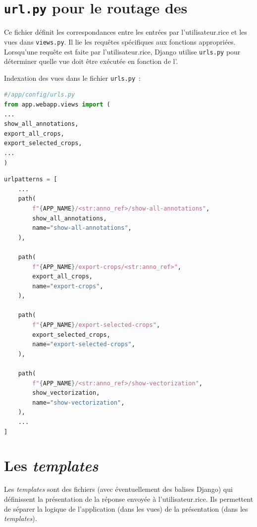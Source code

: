 \section{\texttt{url.py} pour le routage des \URLs}

Ce fichier définit les correspondances entre les \URLs entrées par l'utilisateur.rice et les vues dans \texttt{views.py}. Il lie les requêtes \URL spécifiques aux fonctions appropriées. Lorsqu'une requête est faite par l'utilisateur.rice, Django utilise \texttt{urls.py} pour déterminer quelle vue doit être exécutée en fonction de l'\URL.

Indexation des vues dans le fichier \texttt{urls.py}~:

\begin{lstlisting}[language=python, frame=single, breaklines=true, caption={Contenu du ficher \texttt{urls.py}~: import des \texttt{views}.}]
#/app/config/urls.py
from app.webapp.views import (
...
show_all_annotations,
export_all_crops,
export_selected_crops,
...
)
\end{lstlisting}

\begin{lstlisting}[language=python, frame=single, breaklines=true, caption={Contenu du ficher \texttt{urls.py}~: routage des fonctions et des \URLs.}]
urlpatterns = [
    ...
    path(
        f"{APP_NAME}/<str:anno_ref>/show-all-annotations",
        show_all_annotations,
        name="show-all-annotations",
    ),

    path(
        f"{APP_NAME}/export-crops/<str:anno_ref>",
        export_all_crops,
        name="export-crops",
    ),

    path(
        f"{APP_NAME}/export-selected-crops",
        export_selected_crops,
        name="export-selected-crops",
    ),

    path(
        f"{APP_NAME}/<str:anno_ref>/show-vectorization",
        show_vectorization,
        name="show-vectorization",
    ),
    ...
]
\end{lstlisting}

\section{Les \emph{templates}}

Les \textit{templates} sont des fichiers \html (avec éventuellement des balises Django) qui définissent la présentation de la réponse envoyée à l'utilisateur.rice. Ils permettent de séparer la logique de l'application (dans les vues) de la présentation (dans les \textit{templates}).

